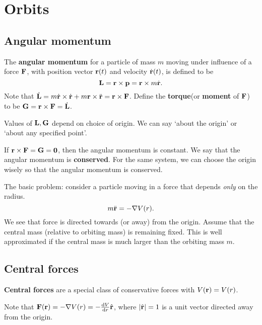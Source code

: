 \section{Orbits}
\subsection{Angular momentum}
\begin{definition}
    The \textbf{angular momentum} for a particle of mass $m$ moving under influence of a force $ {\bf F} $, with position vector ${\bf r}(t)$ and velocity $ \dot{{\bf r}}(t) $, is defined to be 
    \[
        {\bf L} = {\bf r} \times {\bf p} = {\bf r} \times m \dot{{\bf r}}.
    \]
    Note that $ \dot{{\bf L}} = m \dot{{\bf r}}\times \dot{{\bf r}}+m{\bf r} \times \ddot{{\bf r}} = {\bf r} \times {\bf F} $. Define the \textbf{torque}(or \textbf{moment} of ${\bf F}$) to be $ {\bf G} = {\bf r} \times {\bf F} = \dot{{\bf L}} $.
\end{definition}
\begin{note}
    Values of $ {\bf L},{\bf G} $ depend on choice of origin. We can say `about the origin' or `about any specified point'.
\end{note}
\begin{note}
    If $ {\bf r} \times {\bf F} ={\bf G}= \mathbf{0} $, then the angular momentum is constant. We say that the angular momentum is \textbf{conserved}. For the same system, we can choose the origin wisely so that the angular momentum is conserved.
\end{note}

The basic problem: consider a particle moving in a force that depends \textit{only} on the radius.
\[
    m \ddot{{\bf r}} = - \nabla V(r).
\]
We see that force is directed towards (or away) from the origin. Assume that the central mass (relative to orbiting mass) is remaining fixed. This is well approximated if the central mass is much larger than the orbiting mass $m$.

\subsection{Central forces}
\begin{definition}
    \textbf{Central forces} are a special class of conservative forces with $ V({\bf r}) = V(r) $. 
\end{definition}
Note that $ {\bf F}({\bf r}) = - \nabla V(r) = -\frac{\mathrm{d}V}{\mathrm{d}r}\hat{{\bf r}}  $, where $ |\hat{{\bf r}}|=1 $ is a unit vector directed away from the origin.
\begin{center}
\end{center}

